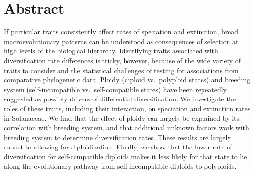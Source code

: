 \section{Abstract}

If particular traits consistently affect rates of speciation and extinction, broad macroevolutionary patterns can be understood as consequences of selection at high levels of the biological hierarchy.
Identifying traits associated with diversification rate differences is tricky, however, because of the wide variety of traits to consider and the statistical challenges of testing for associations from comparative phylogenetic data.
Ploidy (diploid vs.\ polyploid states) and breeding system (self-incompatible vs.\ self-compatible states) have been repeatedly suggested as possibly drivers of differential diversification.
We investigate the roles of these traits, including their interaction, on speciation and extinction rates in Solanaceae.
We find that the effect of ploidy can largely be explained by its correlation with breeding system, and that additional unknown factors work with breeding system to determine diversification rates.
These results are largely robust to allowing for diploidization.
Finally, we show that the lower rate of diversification for self-compatible diploids makes it less likely for that state to lie along the evolutionary pathway from self-incompatible diploids to polyploids.
